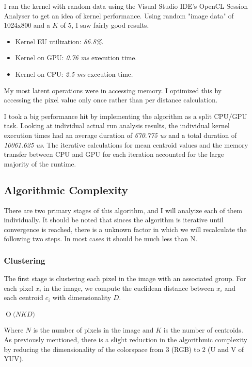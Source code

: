 \documentclass[11pt]{article}
\newcommand{\BigO}[1]{\ensuremath{\operatorname{O}\bigl(#1\bigr)}}
\begin{document}
I ran the kernel with random data using the Visual Studio IDE's OpenCL Session Analyser to get
an idea of kernel performance. Using random "image data" of 1024x800 and a $K$ of 5, I saw
fairly good results.

\begin{itemize}
\item Kernel EU utilization: \emph{86.8\%}.
\item Kernel on GPU: \emph{0.76 ms} execution time.
\item Kernel on CPU: \emph{2.5 ms} execution time.
\end{itemize}

My most latent operations were in accessing memory. I optimized this by accessing the pixel value
only once rather than per distance calculation.

I took a big performance hit by implementing the algorithm as a split CPU/GPU task. Looking
at individual actual run analysis results, the individual kernel execution times had an average
duration of \emph{670.775 us} and a total duration of \emph{10061.625 us}. The iterative
calculations for mean centroid values and the memory transfer between CPU and GPU for each
iteration accounted for the large majority of the runtime.

\subsection{Algorithmic Complexity}

There are two primary stages of this algorithm, and I will analyize each of them individually.
It should be noted that sinces the algorithm is iterative until convergence is reached, there
is a unknown factor in which we will recalculate the following two steps. In most cases it
should be much less than N.

\subsubsection{Clustering}

The first stage is clustering each pixel in the image with an associated group. For
each pixel $x_i$ in the image, we compute the euclidean distance between $x_i$
and each centroid $c_i$ with dimensionality $D$.

$\BigO{NKD}$

Where $N$ is the number of pixels in the image and $K$ is the number of centroids. As
previously mentioned, there is a slight reduction in the algorithmic complexity by
reducing the dimensionality of the colorspace from 3 (RGB) to 2 (U and V of YUV).
\end{document}
